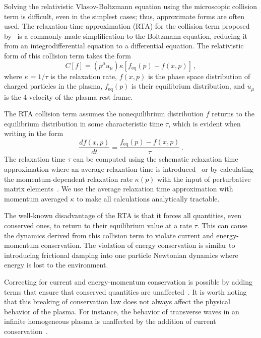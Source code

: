 Solving the relativistic Vlasov-Boltzmann equation using the microscopic collision term  is difficult, even in the simplest cases; thus, approximate forms are often used. The relaxation-time approximation (RTA) for the collision term proposed by~\cite{Anderson:1974nyl} is a commonly made simplification to the Boltzmann equation, reducing it from an integrodifferential equation to a differential equation. The relativistic form of this collision term takes the form
\begin{equation}\label{eq:lincoll}
C[f] = (p^\mu u_\mu) \kappa [ f_\mathrm{eq}(p) - f(x,p) ] \,,
\end{equation}
where $\kappa=1/\tau$ is the relaxation rate, $f(x,p)$ is the phase space distribution of charged particles in the plasma, $f_\mathrm{eq}(p)$ is their equilibrium distribution, and $u_\mu$ is the 4-velocity of the plasma rest frame.

The RTA collision term assumes the nonequilibrium distribution $f$ returns to the equilibrium distribution in some characteristic time $\tau$, which is evident when writing  in the form
\begin{equation}
    \frac{d f(x,p)}{dt} = \frac{f_\mathrm{eq}(p) - f(x,p) }{\tau}\,.
\end{equation}
The relaxation time $\tau$ can be computed using the schematic relaxation time approximation where an average relaxation time is introduced~\cite{Mrowczynski:1988xu,Satow:2014lia} or by calculating the momentum-dependent relaxation rate $\kappa(p)$ with the input of perturbative matrix elements~\cite{Ahonen:1996nq}. We use the average relaxation time approximation with momentum averaged $\kappa$ to make all calculations analytically tractable.

The well-known disadvantage of the RTA is that it forces all quantities, even conserved ones, to return to their equilibrium value at a rate $\tau$. This can cause the dynamics derived from this collision term to violate current and energy-momentum conservation. The violation of energy conservation is similar to introducing frictional damping into one particle Newtonian dynamics where energy is lost to the environment.

Correcting for current and energy-momentum conservation is possible by adding terms that ensure that conserved quantities are unaffected~\cite{Bhatnagar:1954zz,Greene1973,Rocha:2021zcw,Singha:2023eia}. It is worth noting that this breaking of conservation law does not always affect the physical behavior of the plasma. For instance, the behavior of transverse waves in an infinite homogeneous plasma is unaffected by the addition of current conservation~\cite{Formanek:2021blc}.

